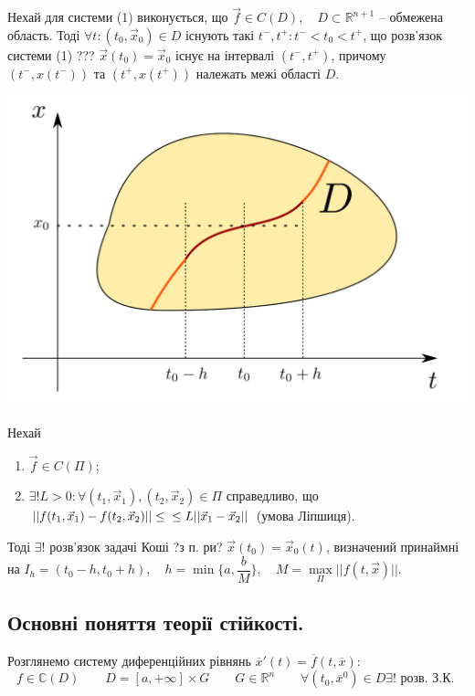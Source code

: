 \documentclass[14pt,a4paper]{scrartcl}
\theoremstyle{definition}
\theoremstyle{remark}
\theoremstyle{definition}
\theoremstyle{definition}
\begin{document}
\begin{boxteo}
Нехай для системи (1) виконується, що $\vec{f} \in C(D), \quad D \subset \mathbb{R}^{n + 1}$ -- обмежена область. Тоді $\forall t : (t_0, \vec{x}_0) \in D$ існують такі $t^{-}, t^{+} : t^{-} < t_0 < t^{+}$, що розв'язок системи (1) ??? $\vec{x}(t_0) = \vec{x}_0$ існує на інтервалі $(t^{-}, t^{+})$, причому $(t^{-}, x(t^{-})) \text{ та } (t^{+}, x(t^{+}))$ належать межі області $D$.
    \begin{center} \includegraphics[scale=0.35]{assets/lectures-d0fd0868.png} \end{center}
\end{boxteo}

\begin{boxteo}
  Нехай
  \begin{enumerate}
    \item $\vec{f} \in C(\Pi)$;
    \item $\exists! L > 0 : \forall (t_1, \vec{x}_1), (t_2, \vec{x}_2) \in \Pi$ справедливо, що $|| f(t_1, \vec{x}_1) - f(t_2, \vec{x}_2)|| \leq \\ \leq L||\vec{x}_1 - \vec{x}_2||$ (умова Ліпшиця).
  \end{enumerate}

  Тоді $\exists!$ розв'язок задачі Коші ?з п. ри? $\vec{x}(t_0) = \vec{x}_0(t)$, визначений принаймні на $I_h = (t_0 - h, t_0 + h), \quad h = \min\{{a, \dfrac{b}{M}}\}, \quad M = \max\limits_{\Pi}||f(t, \vec{x})||$.
\end{boxteo}

\subsection{Основні поняття теорії стійкості.}
Розглянемо систему диференційних рівнянь $\overline{x}'(t) = \overline{f} (t, \overline{x})$:
$$f \in   \mathbb{C}(D)\qquad D = [a, +\infty ]  \times G\qquad G \in \mathbb{R}^{n} \qquad  \forall (t_0, \overline{x}^0) \in D  \exists! \text{ розв. З.К. } $$
\end{document}
